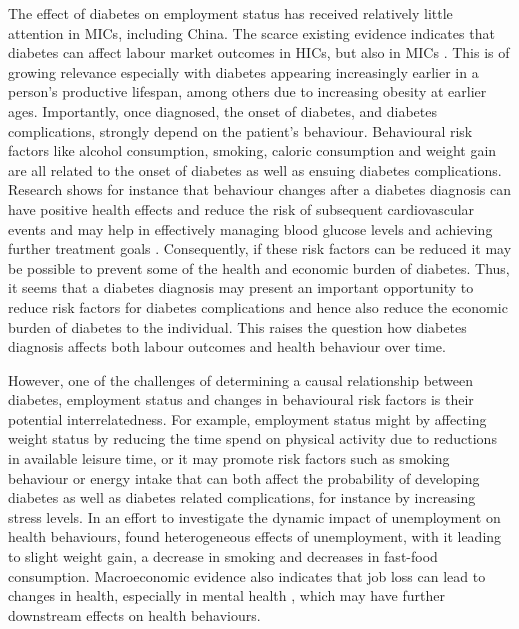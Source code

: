 The effect of diabetes on employment status has received relatively little attention in \acp{MIC}, including China. The scarce existing evidence indicates that diabetes can affect labour market outcomes in \acp{HIC}, but also in \acp{MIC} \parencite{Seuring2016}. This is of growing relevance especially with diabetes appearing increasingly earlier in a person's productive lifespan, among others due to increasing obesity at earlier ages. Importantly, once diagnosed, the onset of diabetes, and diabetes complications, strongly depend on the patient's behaviour. Behavioural risk factors like alcohol consumption, smoking, caloric consumption and weight gain are all related to the onset of diabetes as well as ensuing diabetes complications. Research shows for instance that behaviour changes after a diabetes diagnosis can have positive health effects and reduce the risk of subsequent cardiovascular events \parencite{Long2014} and may help in effectively managing blood glucose levels and achieving further treatment goals \parencite{Zhou2016}. Consequently, if these risk factors can be reduced it may be possible to prevent some of the health and economic burden of diabetes. Thus, it seems that a diabetes diagnosis may present an important opportunity to reduce risk factors for diabetes complications \parencite{DeFineOlivarius2015} and hence also reduce the economic burden of diabetes to the individual. This raises the question how diabetes diagnosis affects both labour outcomes and health behaviour over time.

However, one of the challenges of determining a causal relationship between  diabetes, employment status and changes in behavioural risk factors is their potential interrelatedness. For example, employment status might by affecting weight status by reducing the time spend on physical activity due to reductions in available leisure time, or it may promote risk factors such as smoking behaviour or energy intake that can both affect the probability of developing diabetes as well as diabetes related complications, for instance by increasing stress levels. In an effort to  investigate the dynamic impact of unemployment on health behaviours, \textcite{Colman2014} found heterogeneous effects of unemployment, with it leading to slight weight gain, a decrease in smoking and decreases in fast-food consumption. Macroeconomic evidence also indicates that job loss can lead to changes in health, especially in mental health \parencite{Charles2008}, which may have further downstream effects on health behaviours.

